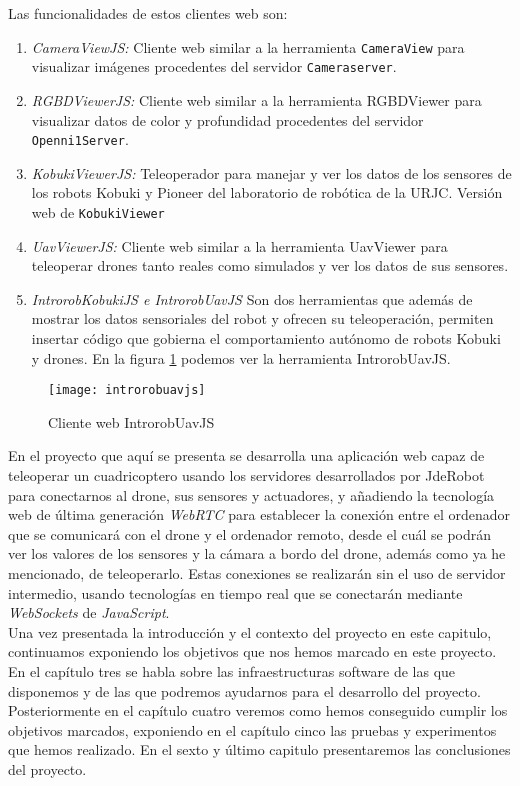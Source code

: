 \noindent Las funcionalidades de estos clientes web son: 

\begin{enumerate}

\item \emph{CameraViewJS:} Cliente web similar a la herramienta \texttt{CameraView} para visualizar imágenes procedentes del servidor \texttt{Cameraserver}. 

\item \emph{RGBDViewerJS:} Cliente web similar a la herramienta RGBDViewer para visualizar datos de color y profundidad procedentes del servidor \texttt{Openni1Server}.
  
\item \emph{KobukiViewerJS:} Teleoperador para manejar y ver los datos de los sensores de los robots Kobuki y Pioneer del laboratorio de robótica de la URJC. Versión web de \texttt{KobukiViewer}
  
  
\item \emph{UavViewerJS:} Cliente web similar a la herramienta UavViewer para teleoperar drones tanto reales como simulados y ver los datos de sus sensores.
  
  
\item \emph{IntrorobKobukiJS e IntrorobUavJS} Son dos herramientas que además de mostrar los datos sensoriales del robot y ofrecen su teleoperación, permiten insertar código que gobierna el comportamiento autónomo de robots Kobuki y drones. En la figura \ref{fig:introrobuavjs} podemos ver la herramienta IntrorobUavJS.

\end{enumerate}

\begin{figure}[htb]
\centering
\texttt{[image: introrobuavjs]}
\caption{Cliente web IntrorobUavJS}
\label{fig:introrobuavjs}
\end{figure}


En el proyecto que aquí se presenta se desarrolla una aplicación web capaz de teleoperar un cuadricoptero usando los servidores desarrollados por JdeRobot para conectarnos al drone, sus sensores y actuadores, y añadiendo la tecnología web de última generación \emph{WebRTC} para establecer la conexión entre el ordenador que se comunicará con el drone y el ordenador remoto, desde el cuál se podrán ver los valores de los sensores y la cámara a bordo del drone, además como ya he mencionado, de teleoperarlo. Estas conexiones se realizarán sin el uso de servidor intermedio, usando tecnologías en tiempo real que se conectarán mediante \emph{WebSockets} de \emph{JavaScript}.\\


Una vez presentada la introducción y el contexto del proyecto en este capitulo, continuamos exponiendo los objetivos que nos hemos marcado en este proyecto. En el capítulo tres se habla sobre las infraestructuras software de las que disponemos y de las que podremos ayudarnos para el desarrollo del proyecto. Posteriormente en el capítulo cuatro veremos como hemos conseguido cumplir los objetivos marcados, exponiendo en el capítulo cinco las pruebas y experimentos que hemos realizado. En el sexto y último capitulo presentaremos las conclusiones del proyecto.\\
